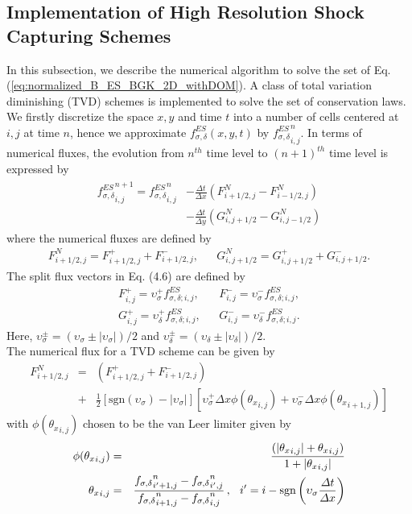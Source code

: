 \documentclass{rsproca}%
\begin{document}
\subsection{Implementation of High Resolution Shock Capturing Schemes}
\label{TVD}
In this subsection, we describe the numerical algorithm to solve the set  of Eq. (\ref{eq:normalized_B_ES_BGK_2D_withDOM}).  A class of total variation diminishing (TVD) schemes is implemented to solve the set of conservation laws.   We firstly discretize the space $x,y$  and time $t$ into a number of cells centered at $i,j$ at time $n$, hence we approximate $f^{ES}_{\sigma,\delta}(x,y,t)$ by ${f^{ES}_{\sigma,\delta}}_{i,j}^{n}$. In terms of numerical fluxes, the evolution from $n^{th}$ time level to $(n+1)^{th}$ time level is expressed by
\begin{align}
	\begin{split}
{f^{ES}_{\sigma,\delta}}_{i,j}^{n+1} = {f^{ES}_{\sigma,\delta}}_{i,j}^{n}
&-\frac{\Delta t}{\Delta x}\left(F_{i+1/2,j}^N-F_{i-1/2,j}^N\right) \\
&-\frac{\Delta t}{\Delta y}\left(G_{i,j+1/2}^N - G_{i,j-1/2}^N\right)
	\end{split}
\end{align}
where the numerical fluxes are defined by
\begin{align}
&F_{i+1/2,j}^N=F_{i+1/2,j}^+ + F_{i+1/2,j}^-,& &G_{i,j+1/2}^N=G_{i,j+1/2}^+ + G_{i,j+1/2}^-.&
\end{align}
The split flux vectors in Eq. (4.6) are defined by
\begin{align}
&F_{i,j}^{+} = \upsilon_\sigma^+ f^{ES}_{\sigma,\delta;i,j},& &F_{i,j}^{-} = \upsilon_\sigma^-f^{ES}_{\sigma,\delta;i,j},& \nonumber \\
&G_{i,j}^{+} = \upsilon_\delta^+ f^{ES}_{\sigma,\delta;i,j},& &G_{i,j}^{-} = \upsilon_\delta^-f^{ES}_{\sigma,\delta;i,j}.&
\end{align}
Here, $\upsilon_\sigma^{\pm} = (\upsilon_\sigma \pm |\upsilon_\sigma |)/2$ and $\upsilon_\delta^{\pm} = (\upsilon_\delta \pm |\upsilon_\delta |)/2$. \\ The numerical flux for a TVD scheme can be given by
\begin{eqnarray}
F_{i+1/2,j}^N &=& \left(F_{i+1/2,j}^++F_{i+1/2,j}^-\right)\nonumber\\
&+&\frac{1}{2}\left[{\mbox{sgn}}(\upsilon_{\sigma})-|\upsilon_{\sigma}|\right]\left[\upsilon_\sigma^+\Delta x \phi({\theta_x}_{i,j})+\upsilon_\sigma^-\Delta x \phi({\theta_x}_{i+1,j})\right]
\end{eqnarray}
with $\phi({\theta_x}_{i,j})$ chosen to be the van Leer limiter \cite{vanLeer1979101} given by
\begin{eqnarray}
\phi({\theta_x}_{i,j})&=&\frac{(|{\theta_x}_{i,j}|+{\theta_x}_{i,j})}{1+|{\theta_x}_{i,j}|}\nonumber\\
{\theta_x}_{i,j}&=&\frac{{f_{\sigma,\delta}}_{i'+1,j}^{n}-{f_{\sigma,\delta}}_{i',j}^{n}}{{f_{\sigma,\delta}}_{i+1,j}^{n}-{f_{\sigma,\delta}}_{i,j}^{n}}\,,\hspace{0.1in} i'=i-{\mbox{sgn}}\left(\upsilon_\sigma\frac{\Delta t}{\Delta x}\right)
\end{eqnarray}
\end{document}
